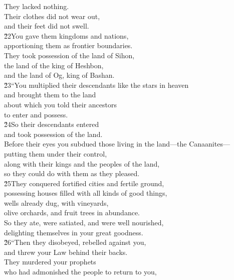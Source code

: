 \begin{poetry}
\poemll    They lacked nothing. \\
\poeml Their clothes did not wear out, \\
\poemll    and their feet did not swell. \\
\poeml \v{22}You gave them kingdoms and nations, \\
\poemll    apportioning them as frontier boundaries. \\
\poeml They took possession of the land of Sihon, \\
\poemll    the land of the king of Heshbon, \\
\poemlll       and the land of Og, king of Bashan. \\
\poeml \v{23}``You multiplied their descendants like the stars in heaven \\
\poemll    and brought them to the land \\
\poeml about which you told their ancestors \\
\poemll    to enter and possess. \\
\poeml \v{24}So their descendants entered \\
\poemll    and took possession of the land. \\
\poeml Before their eyes you subdued those living in the land---the Canaanites--- \\
\poemll    putting them under their control, \\
\poeml along with their kings and the peoples of the land, \\
\poemll    so they could do with them as they pleased. \\
\poeml \v{25}They conquered fortified cities and fertile ground, \\
\poemll    possessing houses filled with all kinds of good things, \\
\poeml wells already dug, with vineyards, \\
\poemll    olive orchards, and fruit trees in abundance. \\
\poeml So they ate, were satiated, and were well nourished, \\
\poemll    delighting themselves in your great goodness. \\
\poeml \v{26}``Then they disobeyed, rebelled against you, \\
\poemll    and threw your Law behind their backs. \\
\poeml They murdered your prophets \\
\poemll    who had admonished the people to return to you, \\

\end{poetry}
